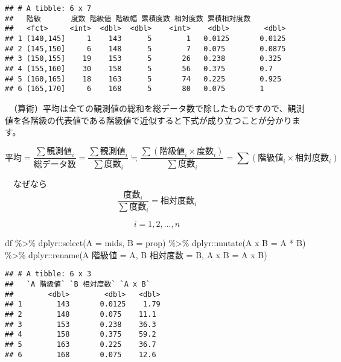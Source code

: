 \documentclass[
  12pt,
]{book}
\newenvironment{Shaded}{\begin{snugshade}}{\end{snugshade}}
\newcommand{\AttributeTok}[1]{\textcolor[rgb]{0.77,0.63,0.00}{#1}}
\newcommand{\FunctionTok}[1]{\textcolor[rgb]{0.00,0.00,0.00}{#1}}
\newcommand{\NormalTok}[1]{#1}
\newcommand{\OtherTok}[1]{\textcolor[rgb]{0.56,0.35,0.01}{#1}}
\newcommand{\SpecialCharTok}[1]{\textcolor[rgb]{0.00,0.00,0.00}{#1}}
\newcommand{\StringTok}[1]{\textcolor[rgb]{0.31,0.60,0.02}{#1}}
\begin{document}
\begin{verbatim}
## # A tibble: 6 x 7
##   階級       度数 階級値 階級幅 累積度数 相対度数 累積相対度数
##   <fct>     <int>  <dbl>  <dbl>    <int>    <dbl>        <dbl>
## 1 (140,145]     1    143      5        1   0.0125       0.0125
## 2 (145,150]     6    148      5        7   0.075        0.0875
## 3 (150,155]    19    153      5       26   0.238        0.325 
## 4 (155,160]    30    158      5       56   0.375        0.7   
## 5 (160,165]    18    163      5       74   0.225        0.925 
## 6 (165,170]     6    168      5       80   0.075        1
\end{verbatim}

　（算術）平均は全ての観測値の総和を総データ数で除したものですので、観測値を各階級の代表値である階級値で近似すると下式が成り立つことが分かります。

\[\mbox{平均} = \frac{\sum{\mbox{観測値}_i}}{総データ数} = \frac{\sum{\mbox{観測値}_i}}{\sum{度数}_i} \fallingdotseq \frac{\sum{(\mbox{階級値}_i \times \mbox{度数}_i)}}{\sum{度数}_i} = \sum{(\mbox{階級値}_i \times \mbox{相対度数}_i)}\]

　なぜなら \[\frac{\mbox{度数}_i}{\sum{\mbox{度数}_i}} = \mbox{相対度数}_i\]

\[i = 1, 2, ... , n\]

\begin{Shaded}
\begin{Highlighting}[]
\NormalTok{df }\SpecialCharTok{\%\textgreater{}\%} 
\NormalTok{  dplyr}\SpecialCharTok{::}\FunctionTok{select}\NormalTok{(}\AttributeTok{A =}\NormalTok{ mids, }\AttributeTok{B =}\NormalTok{ prop) }\SpecialCharTok{\%\textgreater{}\%} 
\NormalTok{  dplyr}\SpecialCharTok{::}\FunctionTok{mutate}\NormalTok{(}\StringTok{\textasciigrave{}}\AttributeTok{A x B}\StringTok{\textasciigrave{}} \OtherTok{=}\NormalTok{ A }\SpecialCharTok{*}\NormalTok{ B) }\SpecialCharTok{\%\textgreater{}\%} 
\NormalTok{  dplyr}\SpecialCharTok{::}\FunctionTok{rename}\NormalTok{(}\StringTok{\textasciigrave{}}\AttributeTok{A 階級値}\StringTok{\textasciigrave{}} \OtherTok{=}\NormalTok{ A, }\StringTok{\textasciigrave{}}\AttributeTok{B 相対度数}\StringTok{\textasciigrave{}} \OtherTok{=}\NormalTok{ B, }\StringTok{\textasciigrave{}}\AttributeTok{A x B}\StringTok{\textasciigrave{}} \OtherTok{=} \StringTok{\textasciigrave{}}\AttributeTok{A x B}\StringTok{\textasciigrave{}}\NormalTok{)}
\end{Highlighting}
\end{Shaded}

\begin{verbatim}
## # A tibble: 6 x 3
##   `A 階級値` `B 相対度数` `A x B`
##        <dbl>        <dbl>   <dbl>
## 1        143       0.0125    1.79
## 2        148       0.075    11.1 
## 3        153       0.238    36.3 
## 4        158       0.375    59.2 
## 5        163       0.225    36.7 
## 6        168       0.075    12.6
\end{verbatim}
\end{document}

